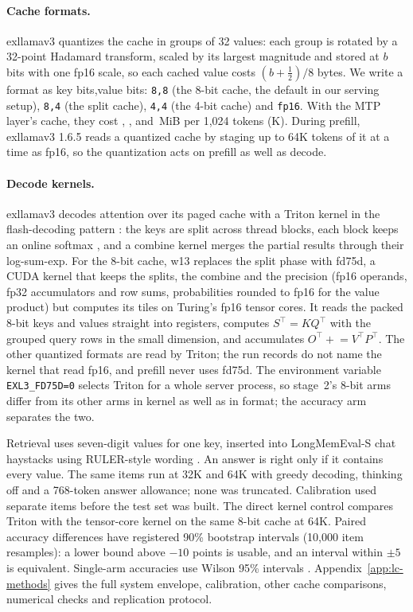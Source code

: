 \documentclass[11pt,letterpaper]{article}
\newcommand{\q}[1]{\texttt{#1}}
\newcommand{\fmt}[1]{\texttt{#1}}
\begin{document}
\paragraph{Cache formats.}
exllamav3 quantizes the cache in groups of 32 values: each group is rotated by
a 32-point Hadamard transform, scaled by its largest magnitude and stored at
$b$ bits with one fp16 scale, so each cached value costs $(b+\tfrac12)/8$ bytes. We
write a format as key bits,value bits: \fmt{8,8} (the 8-bit cache, the default
in our serving setup), \fmt{8,4} (the split cache), \fmt{4,4} (the 4-bit cache)
and \fmt{fp16}. With the MTP layer's cache, they cost \PeCacheMiBEE,
\PeCacheMiBEF, \PeCacheMiBFF{} and \PeCacheMiBFp\,MiB per 1,024 tokens (K).
During prefill, exllamav3 1.6.5 reads a quantized cache by staging up to 64K
tokens of it at a time as fp16, so the quantization acts on prefill as well as
decode.

\paragraph{Decode kernels.}
\label{sec:kernels}
exllamav3 decodes attention over its paged cache with a Triton kernel in the
flash-decoding pattern \citep{dao2023flashdecoding}: the keys are split across
thread blocks, each block keeps an online softmax \citep{milakov2018online},
and a combine kernel merges the partial results through their log-sum-exp.
For the 8-bit cache, w13 replaces the split phase with fd75d, a CUDA kernel
that keeps the splits, the combine and the precision (fp16 operands, fp32
accumulators and row sums, probabilities rounded to fp16 for the value
product) but computes its tiles on Turing's fp16 tensor cores. It reads the
packed 8-bit keys and values straight into registers, computes
$S^{\top}=KQ^{\top}$ with the grouped query rows in the small dimension, and
accumulates $O^{\top}\mathrel{+}=V^{\top}P^{\top}$. The other quantized
formats are read by Triton; the run records do not name the kernel that read
fp16, and prefill never uses fd75d. The
environment variable \q{EXL3\_FD75D=0} selects Triton for a whole server
process, so stage~2's 8-bit arms differ from its other arms in kernel as well
as in format; the accuracy arm separates the two.


Retrieval uses \PeNeedles{} seven-digit values for one key, inserted into
LongMemEval-S chat haystacks using RULER-style wording
\citep{wu2025longmemeval,hsieh2024ruler}. An answer is right only if it
contains every value. The same \PeHTwoN{} items run at 32K and 64K with
greedy decoding, thinking off and a 768-token answer allowance; none was
truncated. Calibration used separate items before the test set was built.
The direct kernel control compares Triton with the tensor-core kernel on
the same 8-bit cache at 64K. Paired accuracy differences have registered
90\% bootstrap intervals (10,000 item resamples): a lower bound above
$-10$ points is usable, and an interval within $\pm5$ is equivalent.
Single-arm accuracies use Wilson 95\% intervals \citep{wilson1927}.
Appendix~\ref{app:lc-methods} gives the full system envelope, calibration,
other cache comparisons, numerical checks and replication protocol.
\end{document}
